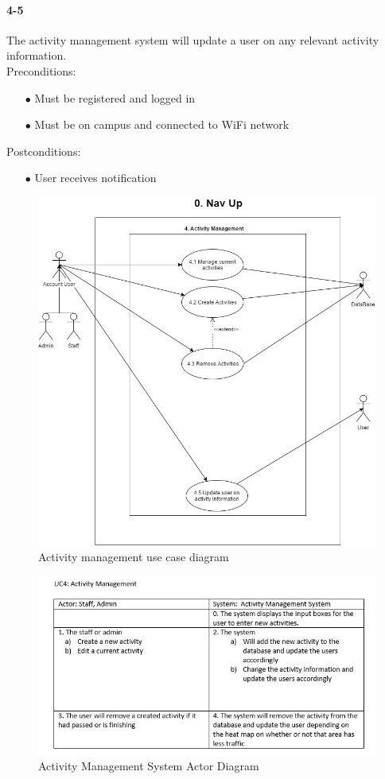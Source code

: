 \documentclass[a4paper,12pt]{article}
\begin{document}
\paragraph{4-5}
The activity management system will update a user on any relevant activity information.\\
Preconditions:
\begin{itemize}
	\item[$\bullet$] Must be registered and logged in
	\item[$\bullet$] Must be on campus and connected to WiFi network
\end{itemize}
Postconditions:
\begin{itemize}
	\item[$\bullet$] User receives notification
\end{itemize}
\begin{figure}[H]
\includegraphics[width=\textwidth]{UseCaseDiagrams/ActManagementUCD.JPG}
\caption{Activity management use case diagram}
\label{fig:Activity management Use Case Diagram}
\end{figure}
\begin{figure}[H]
\includegraphics[width=\textwidth]{ActorDiagrams/ActManagementAD.JPG}
\caption{Activity Management System Actor Diagram}
\label{fig:Activity Management System Actor Diagram}
\end{figure}
\end{document}
